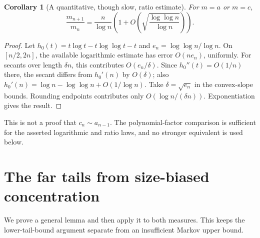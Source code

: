 \documentclass[11pt]{article}
\numberwithin{equation}{section}
\newtheorem{corollary}[theorem]{Corollary}
\theoremstyle{definition}
\theoremstyle{remark}
\begin{document}
\begin{corollary}[A quantitative, though slow, ratio estimate]
For $m=a$ or $m=c$,
\[
 \frac{m_{n+1}}{m_n}
 =\frac{n}{\log n}\left(1+
 O\left(\sqrt{\frac{\log\log n}{\log n}}\right)\right).
\]
\end{corollary}
\begin{proof}
Let $h_0(t)=t\log t-t\log\log t-t$ and
$e_n=\log\log n/\log n$. On $[n/2,2n]$, the available logarithmic
estimate has error $O(ne_n)$, uniformly. For secants over length
$\delta n$, this contributes $O(e_n/\delta)$. Since
$h_0''(t)=O(1/n)$ there, the secant differs from $h_0'(n)$ by
$O(\delta)$; also $h_0'(n)=\log n-\log\log n+O(1/\log n)$.
Take $\delta=\sqrt{e_n}$ in the convex-slope bounds. Rounding endpoints
contributes only $O(\log n/(\delta n))$. Exponentiation gives the result.
\end{proof}
This is not a proof that $c_n\sim a_{n-1}$. The polynomial-factor
comparison is sufficient for the asserted logarithmic and ratio laws,
and no stronger equivalent is used below.

\section{The far tails from size-biased concentration}\label{gml:sec:tails}
We prove a general lemma and then apply it to both measures. This keeps the
lower-tail-bound argument separate from an insufficient Markov upper bound.
\end{document}
